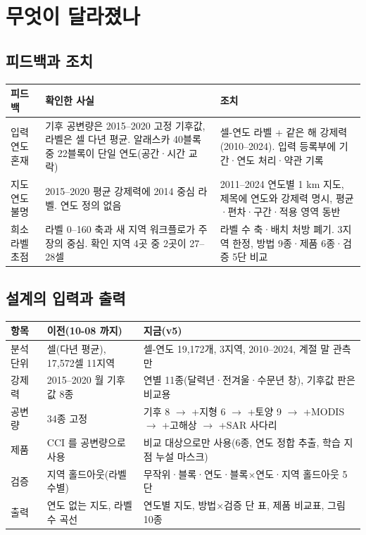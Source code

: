 \documentclass[10pt]{article}
\begin{document}
\section{무엇이 달라졌나}
\subsection{피드백과 조치}
\begin{tabular}{p{}p{}p{}}
\toprule 피드백 & 확인한 사실 & 조치 \\ \midrule
입력 연도 혼재 & 기후 공변량은 2015--2020 고정 기후값, 라벨은 셀 다년 평균. 알래스카 40블록 중 22블록이 단일 연도(공간·시간 교락) & 셀-연도 라벨 + 같은 해 강제력(2010--2024). 입력 등록부에 기간·연도 처리·약관 기록 \\
지도 연도 불명 & 2015--2020 평균 강제력에 2014 중심 라벨. 연도 정의 없음 & 2011--2024 연도별 1 km 지도, 제목에 연도와 강제력 명시, 평균·편차·구간·적용 영역 동반 \\
희소 라벨 초점 & 라벨 0--160 축과 새 지역 워크플로가 주장의 중심. 확인 지역 4곳 중 2곳이 27--28셀 & 라벨 수 축·배치 처방 폐기. 3지역 한정, 방법 9종·제품 6종·검증 5단 비교 \\
\bottomrule
\end{tabular}

\subsection{설계의 입력과 출력}
\begin{tabular}{p{}p{}p{}}
\toprule 항목 & 이전(10-08 까지) & 지금(v5) \\ \midrule
분석 단위 & 셀(다년 평균), 17,572셀 11지역 & 셀-연도 19,172개, 3지역, 2010--2024, 계절 말 관측만 \\
강제력 & 2015--2020 월 기후값 8종 & 연별 11종(달력년·전겨울·수문년 창), 기후값 판은 비교용 \\
공변량 & 34종 고정 & 기후 8 $\to$ +지형 6 $\to$ +토양 9 $\to$ +MODIS $\to$ +고해상 $\to$ +SAR 사다리 \\
제품 & CCI 를 공변량으로 사용 & 비교 대상으로만 사용(6종, 연도 정합 추출, 학습 지점 누설 마스크) \\
검증 & 지역 홀드아웃(라벨 수별) & 무작위·블록·연도·블록$\times$연도·지역 홀드아웃 5단 \\
출력 & 연도 없는 지도, 라벨 수 곡선 & 연도별 지도, 방법$\times$검증 단 표, 제품 비교표, 그림 10종 \\
\bottomrule
\end{tabular}
\end{document}
